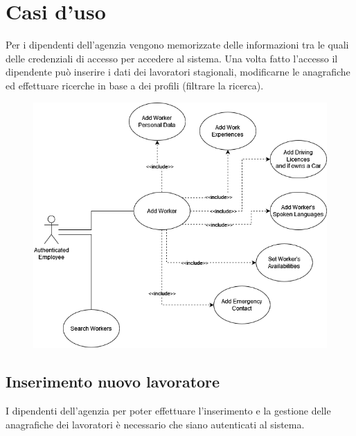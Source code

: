 \documentclass[a4paper, oneside, 12pt]{article}
\begin{document}
\newpage
\section{Casi d'uso}
Per i dipendenti dell'agenzia vengono memorizzate delle informazioni tra le quali delle credenziali di accesso per accedere al sistema. Una volta fatto l'accesso il dipendente può inserire i dati dei lavoratori stagionali, modificarne le anagrafiche ed effettuare ricerche in base a dei profili (filtrare la ricerca). 

\begin{figure}[h!]
	\centering
	\includegraphics[width = 12 cm]{images/casiduso}
	\label{fig:casi d'uso}
\end{figure}

\newpage

\subsection{Inserimento nuovo lavoratore}
I dipendenti dell'agenzia per poter effettuare l'inserimento e la gestione delle anagrafiche dei lavoratori è necessario che siano autenticati al sistema. \\

\end{document}
